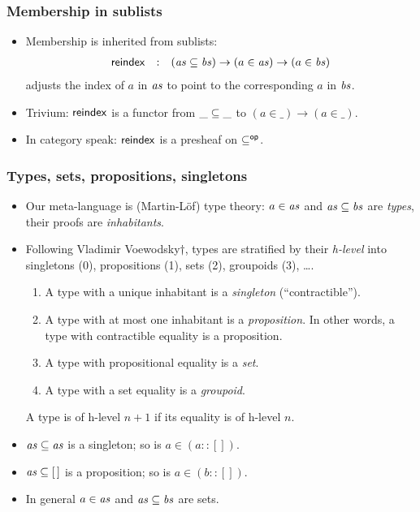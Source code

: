 \documentclass[t,fleqn,usenames,dvipsnames]{beamer}
\newcommand{\cAnn}{\color{red!80!black}}%
\renewcommand{\emph}[1]{{\cAnn#1}}
\newcommand{\cType}{\color{orange!60!black}}
\renewcommand{\emph}[1]{\textit{\cType#1}}
\begin{document}
\begin{frame}%
  \frametitle{Membership in sublists}
  \vspace{-3ex}
  \begin{itemize}
  \item Membership is inherited from sublists:
\[
  \begin{array}{lcl}
\mathsf{reindex} & : & (\mathit{as} \subseteq \mathit{bs}) \to (a \in \mathit{as}) \to (a \in \mathit{bs})
  \end{array}
\]
adjusts the index of $a$ in $\mathit{as}$ to point to the
    corresponding $a$ in $\mathit{bs}$.
\\[2ex]
  \item Trivium: $\mathsf{reindex}$ is a functor from $\_\subseteq\_$ to
    $(a \in \_) \to (a \in \_)$.
  \item In category speak: $\mathsf{reindex}$ is a presheaf on $\subseteq^{\mathsf{op}}$.
  \end{itemize}
\end{frame}


\begin{frame}%
  \frametitle{Types, sets, propositions, singletons}
  \vspace{-3ex}
  \begin{itemize}
  \item Our meta-language is (Martin-L\"of) type theory:
   $a \in \mathit{as}$ and $\mathit{as} \subseteq \mathit{bs}$ are \emph{types},
   their proofs are \emph{inhabitants}.
  \item Following Vladimir Voewodsky$\dagger$, types are
    stratified by their \emph{h-level}
    into singletons (0), propositions (1), sets (2),
    groupoids (3), \dots.
    \begin{enumerate}
    \item A type with a unique inhabitant is a \emph{singleton}
      (``contractible'').
    \item A type with at most one inhabitant is a \emph{proposition}.
      In other words, a type with contractible equality is a
      proposition.
    \item A type with propositional equality is a \emph{set}.
    \item A type with a set equality is a \emph{groupoid}.
    \end{enumerate}
    A type is of h-level $n+1$ if its equality is of h-level $n$.
  \item $\mathit{as} \subseteq \mathit{as}$ is a singleton; so is $a \in (a :: [])$.
  \item $\mathit{as} \subseteq [\,]$ is a proposition; so is $a \in (b ::
    [])$.
  \item In general $a \in \mathit{as}$ and $\mathit{as} \subseteq \mathit{bs}$ are sets.
  \end{itemize}
\end{frame}
\end{document}
